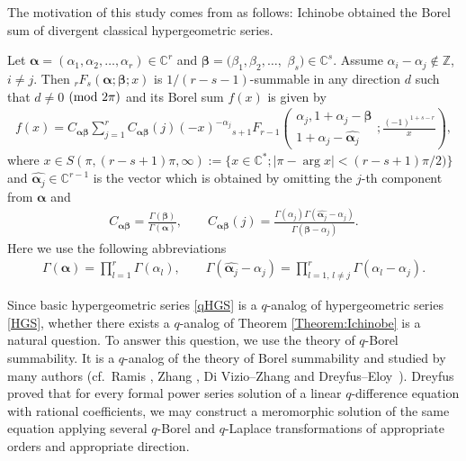 The motivation of this study comes from as follows: Ichinobe \cite{Ichinobe2001} obtained the Borel sum of divergent classical hypergeometric series.
\begin{Theorem}\label{Theorem:Ichinobe}
Let $\bm{\alpha}=(\alpha_1,\alpha_2,\ldots,\alpha_r)\in\mathbb{C}^r$ and $\bm{\beta}=(\beta_1,\beta_2,\ldots,$ $\beta_s)\in\mathbb{C}^s$. Assume $\alpha_i-\alpha_j\notin\mathbb{Z}$, $i\neq j$. Then ${}_rF_s(\bm{\alpha};\bm{\beta};x)$ is $1/(r-s-1)$-summable in any direction $d$ such that $d\neq0$ $({\rm mod}~2\pi)$ and its Borel sum $f(x)$ is given by
\begin{gather*}\label{Ichinobe_result1}
f(x)=C_{\bm{\alpha\beta}}\sum_{j=1}^rC_{\bm{\alpha\beta}}(j)(-x)^{-\alpha_j}{}_{s+1}F_{r-1}\left( \begin{matrix}
\alpha_j,1+\alpha_j-\bm{\beta}\\
1+\alpha_j-\widehat{\bm{\alpha}_j}
\end{matrix}
;\frac{(-1)^{1+s-r}}{x}\right),
\end{gather*}
where $x\in S(\pi,(r-s+1)\pi,\infty):=\{x\in\mathbb{C}^*;\left|\pi-\arg x\right|<(r-s+1)\pi/2)\}$ and $\widehat{\bm{\alpha}_j}\in\mathbb{C}^{r-1}$ is the vector which is obtained by omitting the $j$-th component from $\bm{\alpha}$ and
\begin{gather}\label{Ichinobe_result2}
C_{\bm{\alpha\beta}}=\frac{\Gamma(\bm{\beta})}{\Gamma(\bm{\alpha})},\qquad C_{\bm{\alpha\beta}}(j)=\frac{\Gamma(\alpha_j)\Gamma(\widehat{\bm{\alpha}_j}-\alpha_j)}{\Gamma(\bm{\beta}-\alpha_j)}.
\end{gather}
Here we use the following abbreviations
\begin{gather*}
\Gamma(\bm{\alpha})=\prod_{l=1}^r\Gamma(\alpha_l),\qquad \Gamma(\widehat{\bm{\alpha}_j}-\alpha_j)=\prod_{l=1,\,l\neq j}^r\Gamma(\alpha_l-\alpha_j).
\end{gather*}
\end{Theorem}
Since basic hypergeometric series \eqref{qHGS} is a $q$-analog of hypergeometric series \eqref{HGS}, whether there exists a $q$-analog of Theorem \ref{Theorem:Ichinobe} is a natural question. To answer this question, we use the theory of $q$-Borel summability. It is a $q$-analog of the theory of Borel summability and studied by many authors (cf.~Ramis \cite{Ramis1992}, Zhang \cite{Zhang2002,Zhang2005}, Di Vizio--Zhang \cite{Vizio-Zhang} and Dreyfus--Eloy~\cite{DreyfusEloy2016}). Dreyfus~\cite{Dreyfus2015_1} proved that for every formal power series solution of a linear $q$-difference equation with rational coefficients, we may construct a meromorphic solution of the same equation applying several $q$-Borel and $q$-Laplace transformations of appropriate orders and appropriate direction.

